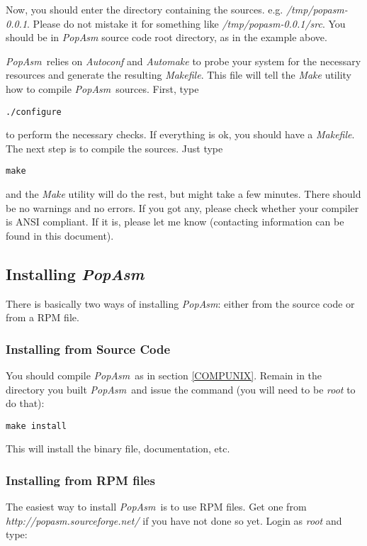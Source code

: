 \documentclass[a4paper,12pt]{book}
\newcommand{\popasm}{\emph{PopAsm}}
\begin{document}
Now, you should enter the directory containing the sources. e.g.
\emph{/tmp/popasm-0.0.1}. Please do not mistake it for something
like \emph{/tmp/popasm-0.0.1/src}. You should be in \popasm
source code root directory, as in the example above.

\popasm\ relies on \emph{Autoconf}\cite{AUTOCONF} and
\emph{Automake}\cite{AUTOMAKE} to probe your system for the
necessary resources and generate the resulting \emph{Makefile}.
This file will tell the \emph{Make}\cite{MAKE} utility how to
compile \popasm\ sources. First, type

\begin{verbatim}
./configure
\end{verbatim}

to perform the necessary checks. If everything is ok, you should have a
\emph{Makefile}. The next step is to compile the sources. Just type

\begin{verbatim}
make
\end{verbatim}

and the \emph{Make} utility will do the rest, but might take a few
minutes. There should be no warnings and no errors. If you got any,
please check whether your compiler is ANSI compliant. If it is,
please let me know (contacting information can be found in this
document).

\subsection{Installing \popasm}

There is basically two ways of installing \popasm: either from
the source code or from a RPM file.

\subsubsection{Installing from Source Code}
You should compile \popasm\ as in section \ref{COMPUNIX}. Remain
in the directory you built \popasm\ and issue the command (you will
need to be \emph{root} to do that):

\begin{verbatim}
make install
\end{verbatim}

This will install the binary file, documentation, etc.

\subsubsection{Installing from RPM files}
The easiest way to install \popasm\ is to use RPM files. Get one from
\emph{http://popasm.sourceforge.net/} if you have not done so yet.
Login as \emph{root} and type:
\end{document}
